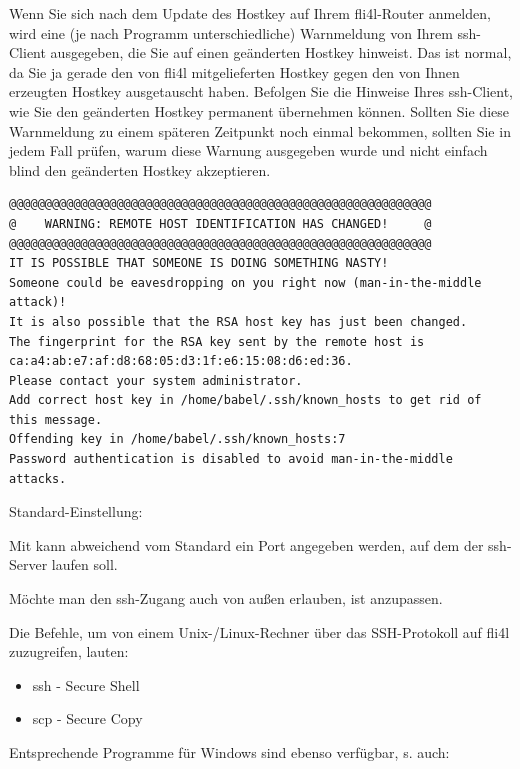 \begin{description}
  Wenn Sie sich nach dem Update des Hostkey auf Ihrem fli4l-Router
  anmelden, wird eine (je nach Programm unterschiedliche) Warnmeldung
  von Ihrem ssh-Client ausgegeben, die Sie auf einen geänderten Hostkey
  hinweist. Das ist normal, da Sie ja gerade den von fli4l mitgelieferten
  Hostkey gegen den von Ihnen erzeugten Hostkey ausgetauscht haben.
  Befolgen Sie die Hinweise Ihres ssh-Client, wie Sie den geänderten
  Hostkey permanent übernehmen können. Sollten Sie diese Warnmeldung zu
  einem späteren Zeitpunkt noch einmal bekommen, sollten Sie in jedem Fall
  prüfen, warum diese Warnung ausgegeben wurde und nicht einfach blind den
  geänderten Hostkey akzeptieren.

\begin{verbatim}
@@@@@@@@@@@@@@@@@@@@@@@@@@@@@@@@@@@@@@@@@@@@@@@@@@@@@@@@@@@
@    WARNING: REMOTE HOST IDENTIFICATION HAS CHANGED!     @
@@@@@@@@@@@@@@@@@@@@@@@@@@@@@@@@@@@@@@@@@@@@@@@@@@@@@@@@@@@
IT IS POSSIBLE THAT SOMEONE IS DOING SOMETHING NASTY!
Someone could be eavesdropping on you right now (man-in-the-middle attack)!
It is also possible that the RSA host key has just been changed.
The fingerprint for the RSA key sent by the remote host is
ca:a4:ab:e7:af:d8:68:05:d3:1f:e6:15:08:d6:ed:36.
Please contact your system administrator.
Add correct host key in /home/babel/.ssh/known_hosts to get rid of this message.
Offending key in /home/babel/.ssh/known_hosts:7
Password authentication is disabled to avoid man-in-the-middle attacks.
\end{verbatim}


  Standard-Einstellung: 

  Mit  kann abweichend vom Standard ein Port
  angegeben werden, auf dem der ssh-Server laufen soll.

  Möchte man den ssh-Zugang auch von außen erlauben, ist
   anzupassen.

  Die Befehle, um von einem Unix-/Linux-Rechner über das SSH-Protokoll
  auf fli4l zuzugreifen, lauten:
  \begin{itemize}
  \item ssh - Secure Shell
  \item scp - Secure Copy
  \end{itemize}

  Entsprechende Programme für Windows sind ebenso verfügbar, s.
  auch:
  \linebreak
  \linebreak
  \linebreak


\end{description}
